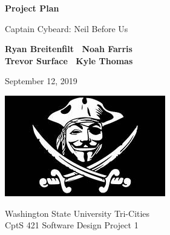 \begin{titlepage}
    \begin{center}
        \vspace*{1cm}

        \Huge
        \textbf{Project Plan}

        \vspace{.5cm}
        \LARGE
        Captain Cybeard: Neil Before Us

        \vspace{1cm}

        \textbf{Ryan Breitenfilt \textbar\ Noah Farris\\ Trevor Surface \textbar\ Kyle Thomas}

        \vspace{.2cm}
        \Large
        September 12, 2019

        \vspace{2cm}
        \includegraphics[scale=1]{logo}

        \vfill

        Washington State University Tri-Cities\\
        CptS 421 Software Design Project 1

    \end{center}
\end{titlepage}

